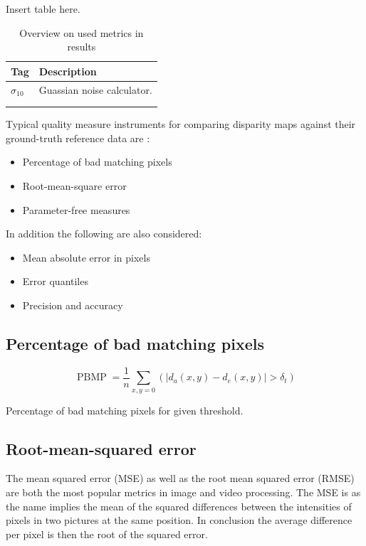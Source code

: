 Insert table here.

\begin{table}[h!]
\centering
\begin{tabular}{l|l}
\textbf{Tag} & \textbf{Description} \\ \hline
$\sigma_{10}$ & Guassian noise calculator. \\ \hline
 &  \\ \hline
 &  \\
\end{tabular}
\caption{Overview on used metrics in results}
\label{tab:metrics}
\end{table}

\noindent Typical quality measure instruments for comparing disparity maps against their ground-truth reference data are  \citep{cyganek2011introduction}:

\begin{itemize}
  \item Percentage of bad matching pixels
  \item Root-mean-square error
  \item Parameter-free measures
\end{itemize}

In addition the following are also considered:

\begin{itemize}
  \item Mean absolute error in pixels
  \item Error quantiles
  \item Precision and accuracy
\end{itemize}

\subsection*{Percentage of bad matching pixels}

\begin{equation}
  \operatorname{PBMP}=\frac{1}{n} \sum_{x,y=0}^{}(|d_a(x,y) - d_e(x,y)| > \delta_t)
\end{equation}

\noindent Percentage of bad matching pixels for given threshold.

\subsection*{Root-mean-squared error}

The mean squared error (MSE) as well as the root mean squared error (RMSE) are both the most popular metrics in image and video processing.
The MSE is as the name implies the mean of the squared differences between the intensities of pixels in two pictures at the same position.
In conclusion the average difference per pixel is then the root of the squared error.

